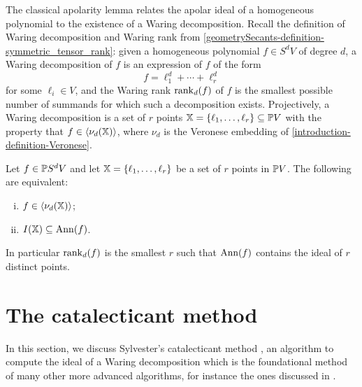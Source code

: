 The classical apolarity lemma relates the apolar ideal of a homogeneous polynomial to the existence of a Waring decomposition. Recall the definition of Waring decomposition and Waring rank from \ref{geometrySecants-definition-symmetric_tensor_rank}: given a homogeneous polynomial $f \in S^d V$ of degree $d$, a Waring decomposition of $f$ is an expression of $f$ of the form 
\[
f = \ell_1^d + \cdots + \ell_r^d
\]
for some $\ell_i \in V$, and the Waring rank $\mathrm{rank}_d(f)$ of $f$ is the smallest possible number of summands for which such a decomposition exists. Projectively, a Waring decomposition is a set of $r$ points $\mathbb{X} = \{ \ell_1 , \ldots , \ell_r \} \subseteq \mathbb{P} V$ with the property that $f \in \langle \nu_d(\mathbb{X}) \rangle$, where $\nu_d$ is the Veronese embedding of \ref{introduction-definition-Veronese}. 

\begin{lemma}
 \label{apolarity-lemma-apolarityLemma}
 Let $f \in \mathbb{P} S^d V$ and let $\mathbb{X} = \{ \ell_1 , \ldots , \ell_r\}$ be a set of $r$ points in $\mathbb{P} V$. The following are equivalent:
 \begin{enumerate}[(i)]
  \item $f \in \langle \nu_d(\mathbb{X}) \rangle$;
  \item $I(\mathbb{X}) \subseteq \operatorname{Ann}(f)$.
 \end{enumerate}
 In particular $\mathrm{rank}_d(f)$ is the smallest $r$ such that $\operatorname{Ann}(f)$ contains the ideal of $r$ distinct points.
\end{lemma}



\section{The catalecticant method}
\label{apolarity-section-catalecticant}
In this section, we discuss Sylvester's catalecticant method \cite{Syl52,IK99}, an algorithm to compute the ideal of a Waring decomposition which is the foundational method of many other more advanced algorithms, for instance the ones discussed in \cite{BCMT10,BBCM13,BT20,LMR23}.

